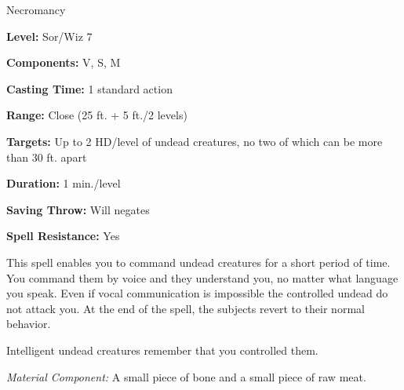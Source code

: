 
Necromancy

\textbf{Level:} Sor/Wiz 7

\textbf{Components:} V, S, M

\textbf{Casting Time:} 1 standard action

\textbf{Range:} Close (25 ft. + 5 ft./2 levels)

\textbf{Targets:} Up to 2 HD/level of undead creatures, no two of which can be 
more than 30 ft. apart

\textbf{Duration:} 1 min./level

\textbf{Saving Throw:} Will negates

\textbf{Spell Resistance:} Yes

This spell enables you to command undead creatures for a short period of time. 
You command them by voice and they understand you, no matter what language you 
speak. Even if vocal communication is impossible the controlled undead do not attack 
you. At the end of the spell, the subjects revert to their normal behavior.

Intelligent undead creatures remember that you controlled them.

\textit{Material Component:} A small piece of bone and a small piece of raw meat.

